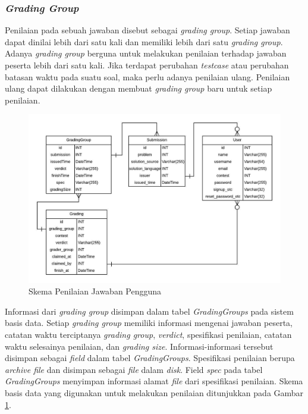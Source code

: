 \subsubsection{\textit{Grading Group}}

\par Penilaian pada sebuah jawaban disebut sebagai \textit{grading group}. Setiap jawaban dapat dinilai lebih dari satu kali dan memiliki lebih dari satu \textit{grading group}. Adanya \textit{grading group} berguna untuk melakukan penilaian terhadap jawaban peserta lebih dari satu kali. Jika terdapat perubahan \textit{testcase} atau perubahan batasan waktu pada suatu soal, maka perlu adanya penilaian ulang. Penilaian ulang dapat dilakukan dengan membuat \textit{grading group} baru untuk setiap penilaian.

\begin{figure}[ht!]
    \centering
    \includegraphics[width=\textwidth]{images/grader-schema}
    \caption{Skema Penilaian Jawaban Pengguna}
    \label{fig:grader-schema}
\end{figure}

\par Informasi dari \textit{grading group} disimpan dalam tabel \textit{GradingGroups} pada sistem basis data. Setiap \textit{grading group} memiliki informasi mengenai jawaban peserta, catatan waktu terciptanya \textit{grading group}, \textit{verdict}, spesifikasi penilaian, catatan waktu selesainya penilaian, dan \textit{grading size}. Informasi-informasi tersebut disimpan sebagai \textit{field} dalam tabel \textit{GradingGroups}. Spesifikasi penilaian berupa \textit{archive file} dan disimpan sebagai \textit{file} dalam \textit{disk}. Field \textit{spec} pada tabel \textit{GradingGroups} menyimpan informasi alamat \textit{file} dari spesifikasi penilaian. Skema basis data yang digunakan untuk melakukan penilaian ditunjukkan pada Gambar \ref{fig:grader-schema}.

